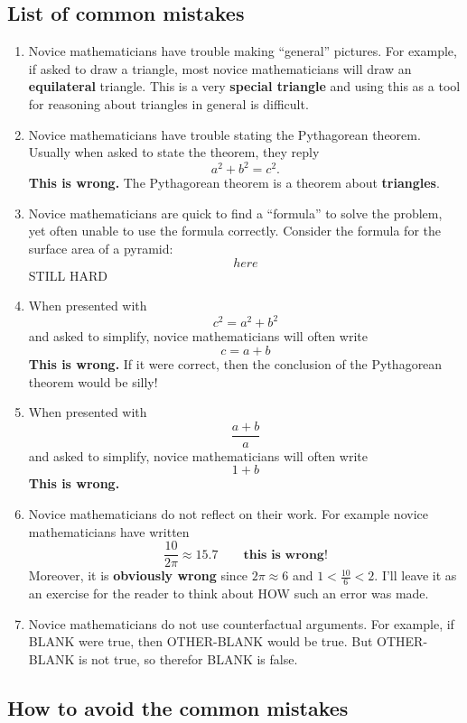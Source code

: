 \documentclass[handout,nooutcomes,noauthor]{ximera}
\begin{document}
\subsection*{List of common mistakes}
\begin{enumerate}
\item Novice mathematicians have trouble making ``general''
  pictures. For example, if asked to draw a triangle, most novice
  mathematicians will draw an \textbf{equilateral} triangle. This is a
  very \textbf{special triangle} and using this as a tool for
  reasoning about triangles in general is difficult.
\item Novice mathematicians have trouble stating the Pythagorean
  theorem. Usually when asked to state the theorem, they reply
  \[
  a^2+b^2=c^2.
  \]
  \textbf{This is wrong.} The Pythagorean theorem is a theorem
  about \textbf{triangles}. 
\item Novice mathematicians are quick to find a ``formula'' to solve
  the problem, yet often unable to use the formula correctly. Consider
  the formula for the surface area of a pyramid:
  \[
  here
  \]
  STILL HARD
\item When presented with
  \[
  c^2 = a^2 + b^2
  \]
  and asked to simplify, novice mathematicians will often write
  \[
  c = a +b
  \]
  \textbf{This is wrong.} If it were correct, then the
  conclusion of the Pythagorean theorem would be silly!
\item  When presented with
  \[
  \frac{a + b}{a}
  \]
  and asked to simplify, novice mathematicians will often write
  \[
  1+b
  \]
  \textbf{This is wrong.}
\item Novice mathematicians do not reflect on their work. For example
  novice mathematicians have written
  \[
  \frac{10}{2\pi} \approx  15.7\qquad\textbf{this is wrong!}
  \]
  Moreover, it is \textbf{obviously wrong} since $2\pi\approx 6$ and
  $1<\frac{10}{6} <2$. I'll leave it as an exercise for the reader to
  think about HOW such an error was made.

\item Novice mathematicians do not use counterfactual arguments. For example, if BLANK were true, then OTHER-BLANK would be true. But OTHER-BLANK is not true, so therefor BLANK is false.
\end{enumerate}


\subsection*{How to avoid the common mistakes}
\end{document}
